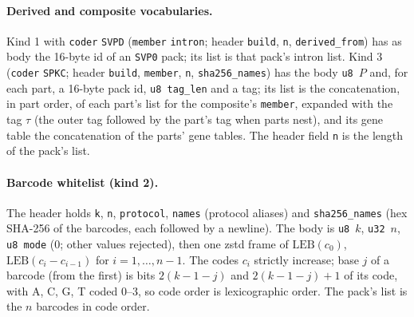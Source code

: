 \paragraph{Derived and composite vocabularies.}
Kind 1 with \texttt{coder} \texttt{SVPD} (\texttt{member} \texttt{intron}; header \texttt{build}, \texttt{n},
\texttt{derived\_from}) has as body the 16-byte id of an \texttt{SVP0} pack; its list is that pack's intron list. Kind 3
(\texttt{coder} \texttt{SPKC}; header \texttt{build}, \texttt{member}, \texttt{n}, \texttt{sha256\_names}) has the body
\texttt{u8}~$P$ and, for each part, a 16-byte pack id, \texttt{u8 tag\_len} and a tag; its list is the concatenation, in
part order, of each part's list for the composite's \texttt{member}, expanded with the tag $\tau$ (the outer tag
followed by the part's tag when parts nest), and its gene table the concatenation of the parts' gene tables. The header
field \texttt{n} is the length of the pack's list.

\paragraph{Barcode whitelist (kind 2).}
The header holds \texttt{k}, \texttt{n}, \texttt{protocol}, \texttt{names} (protocol aliases) and
\texttt{sha256\_names} (hex SHA-256 of the barcodes, each followed by a newline). The body is \texttt{u8}~$k$,
\texttt{u32}~$n$, \texttt{u8 mode} (0; other values rejected), then one zstd frame of $\mathrm{LEB}(c_0)$,
$\mathrm{LEB}(c_i-c_{i-1})$ for $i=1,\dots,n-1$. The codes $c_i$ strictly increase; base $j$ of a barcode (from the
first) is bits $2(k-1-j)$ and $2(k-1-j)+1$ of its code, with A, C, G, T coded 0--3, so code order is lexicographic
order. The pack's list is the $n$ barcodes in code order.

